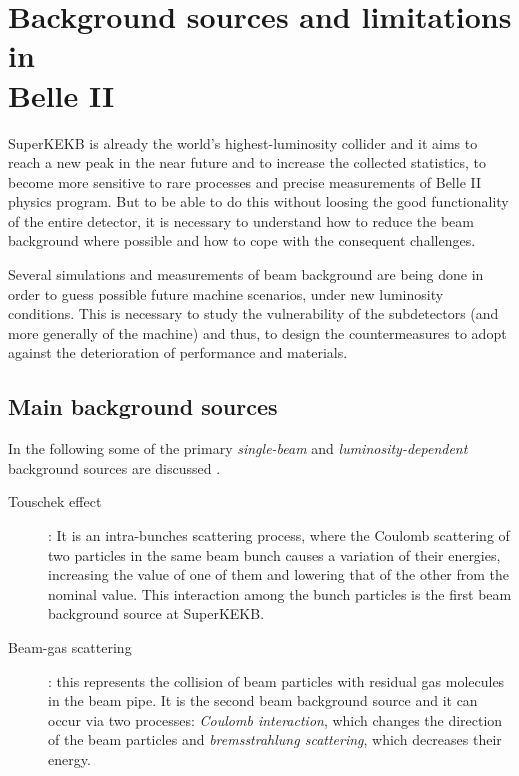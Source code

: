 \section{Background sources and limitations in \\Belle II}

SuperKEKB is already the world's highest-luminosity collider and it aims to reach a new peak in the near future and to increase the collected statistics, to become more sensitive to rare processes and precise measurements of Belle II physics program. 
But to be able to do this without loosing the good functionality of the entire detector, it is necessary to understand how to reduce the beam background where possible and how to cope with the consequent challenges.

Several simulations and measurements of beam background \cite{Natochii:2023thp} are being done in order to guess possible future machine scenarios, under new luminosity conditions.
This is necessary to study the vulnerability of the subdetectors (and more generally of the machine) and thus, to design the countermeasures to adopt against the deterioration of performance and materials.


\subsection{Main background sources}

In the following some of the primary \textit{single-beam} and \textit{luminosity-dependent} background sources are discussed \cite{physics_book, Natochii:2022vcs}.


\begin{description}
\item[Touschek effect]: 
	It is an intra-bunches scattering process, where the Coulomb scattering of two particles in the same beam bunch causes a variation of their energies, increasing the value of one of them and lowering that of the other from the nominal value. This interaction among the bunch particles is the first beam background source at SuperKEKB.
\item[Beam-gas scattering]: 
	this represents the collision of beam particles with residual gas molecules in the beam pipe. It is the second beam background source and it can occur via two processes: \emph{Coulomb interaction}, which changes the direction of the beam particles and \emph{bremsstrahlung scattering}, which decreases their energy. 
\end{description}
	
